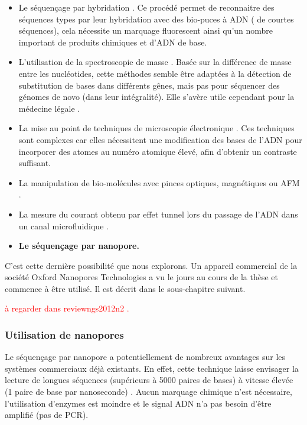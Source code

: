 \documentclass[a4paper,11pt]{article}
\begin{document}
\begin{itemize}


\item Le séquençage par hybridation \cite{Zhang2003}. Ce procédé permet de reconnaitre des séquences types par leur hybridation avec des bio-puces à ADN ( de courtes séquences), cela nécessite un marquage fluorescent ainsi qu'un nombre important de produits chimiques et d'ADN de base.

\item L'utilisation de la spectroscopie de masse \cite{Edwards2005}. Basée sur la différence de masse entre les nucléotides, cette méthodes semble être adaptées à la détection de substitution de bases dans différents gênes, mais pas pour séquencer des génomes de novo (dans leur intégralité). Elle s'avère utile cependant pour la médecine légale \cite{Howard2013}. 

\item La mise au point de techniques de microscopie électronique \cite{Bell2012}. Ces techniques sont complexes car elles nécessitent une modification des bases de l'ADN pour incorporer des atomes au numéro atomique élevé, afin d'obtenir un contraste suffisant.

\item La manipulation de bio-molécules avec pinces optiques, magnétiques ou AFM \cite{Pareek2011,Ding2012}.

\item La mesure du courant obtenu par effet tunnel lors du passage de l'ADN dans un canal microfluidique \cite{Ohshiro2012,DiVentra2013}.

\item \textbf{Le séquençage par nanopore.}


\end{itemize}


C'est cette dernière possibilité que nous explorons. Un appareil commercial de la société Oxford Nanopores Technologies a vu le jours au cours de la thèse \cite{Mikheyev2014,Goodwin2015,Urban2015} et commence à être utilisé. Il est décrit dans le sous-chapitre suivant.


\textcolor{red}{à regarder dans reviewngs2012n2 \cite{Liu2012}.}

\subsubsection{Utilisation de nanopores}

Le séquençage par nanopore a potentiellement de nombreux avantages sur les systèmes commerciaux déjà existants. En effet, cette technique laisse envisager la lecture de longues séquences (supérieurs à 5000 paires de bases) à vitesse élevée (1 paire de base par nanoseconde) \cite{Timp2010,Branton2008}. Aucun marquage chimique n'est nécessaire, l'utilisation d'enzymes est moindre et le signal ADN n'a pas besoin d'être amplifié (pas de PCR).
\end{document}
